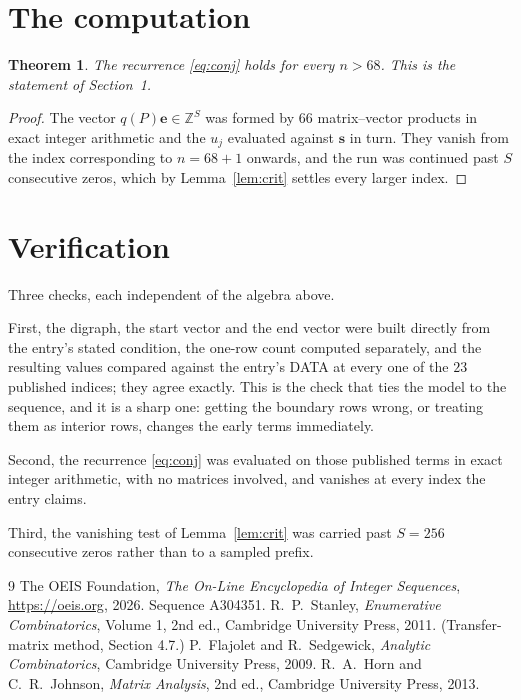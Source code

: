 \documentclass[11pt,a4paper]{article}
\theoremstyle{plain}
\newtheorem{theorem}{Theorem}
\theoremstyle{definition}
\begin{document}
\section{The computation}

\begin{theorem}
The recurrence \eqref{eq:conj} holds for every $n>68$. This is the statement of
Section~1.
\end{theorem}

\begin{proof}
The vector $q(P)\mathbf{e}\in\mathbb{Z}^{S}$ was formed by $66$ matrix--vector
products in exact integer arithmetic and the $u_j$ evaluated against $\mathbf{s}$ in turn.
They vanish from the index corresponding to $n=68+1$ onwards, and the run was continued
past $S$ consecutive zeros, which by Lemma~\ref{lem:crit} settles every larger index.
\end{proof}

\section{Verification}

Three checks, each independent of the algebra above.

First, the digraph, the start vector and the end vector were built directly from the
entry's stated condition, the one-row count computed separately, and the resulting values
compared against the entry's DATA at every one of the $23$ published indices; they
agree exactly. This is the check that ties the model to the sequence, and it is a sharp one:
getting the boundary rows wrong, or treating them as interior rows, changes the early terms
immediately.

Second, the recurrence \eqref{eq:conj} was evaluated on those published terms in exact
integer arithmetic, with no matrices involved, and vanishes at every index the entry claims.

Third, the vanishing test of Lemma~\ref{lem:crit} was carried past $S=256$ consecutive
zeros rather than to a sampled prefix.

\begin{thebibliography}{9}
 The OEIS Foundation, \emph{The On-Line Encyclopedia of Integer
Sequences}, \url{https://oeis.org}, 2026. Sequence A304351.
 R.~P.~Stanley, \emph{Enumerative Combinatorics}, Volume 1, 2nd ed.,
Cambridge University Press, 2011. (Transfer-matrix method, Section 4.7.)
 P.~Flajolet and R.~Sedgewick, \emph{Analytic Combinatorics}, Cambridge
University Press, 2009.
 R.~A.~Horn and C.~R.~Johnson, \emph{Matrix Analysis}, 2nd ed., Cambridge
University Press, 2013.
\end{thebibliography}
\end{document}
